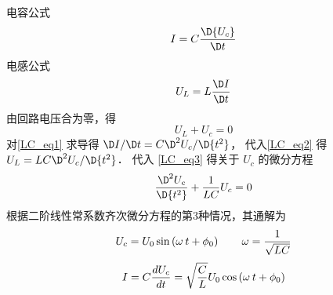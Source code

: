 
电容公式
\begin{equation}\label{LC_eq1}
I = C\frac{{\D {U_c}}}{{\D t}}
\end{equation}
电感公式
\begin{equation}\label{LC_eq2}
{U_L} = L\frac{{\D I}}{{\D t}}
\end{equation}
由回路电压合为零，得
\begin{equation}\label{LC_eq3}
{U_L} + {U_c} = 0
\end{equation}
对\autoref{LC_eq1} 求导得 ${\D I}/{\D t} = C{{{\D^2}{U_c}}}/{{\D{t^2}}}$， 代入\autoref{LC_eq2} 得 ${U_L} = LC {{{\D^2}{U_c}}}/{{\D{t^2}}}$． 代入  \autoref{LC_eq3}  得关于 ${U_c}$ 的微分方程
\begin{equation}
\frac{{{\D^2}{U_c}}}{{\D{t^2}}} + \frac{1}{{LC}}{U_c} = 0
\end{equation}
根据二阶线性常系数齐次微分方程的第3种情况，其通解为
\begin{equation}
{U_c} = {U_0}\sin \left( {\omega {\kern 1pt} {\kern 1pt} t + {\phi _0}} \right)
\qquad
\omega  = \frac{1}{{\sqrt {LC} }}
\end{equation}
\begin{equation}
I = C\frac{{d{U_c}}}{{dt}} = \sqrt {\frac{C}{L}} {U_0}\cos \left( {\omega {\kern 1pt} {\kern 1pt} t + {\phi _0}} \right)
\end{equation}
 
